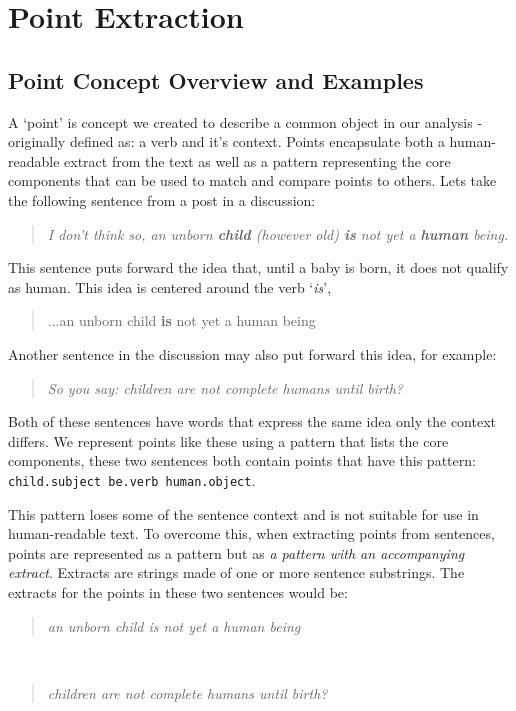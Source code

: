 \chapter{Point Extraction\label{chap:point-extraction}}
  \section{Point Concept Overview and Examples}
    A `point' is concept we created to describe a common object in our analysis - originally defined as: a verb and it's context. Points encapsulate both a human-readable extract from the text as well as a pattern representing the core components that can be used to match and compare points to others. Lets take the following sentence from a post in a discussion:

    \smallskip
    \begin{center}
      \blockquote{\textit{I don't think so, an unborn \textbf{child} (however old) \textbf{is} not yet a \textbf{human} being.}}
    \end{center}
    \smallskip

    This sentence puts forward the idea that, until a baby is born, it does not qualify as human. This idea is centered around the verb `\textit{is}', \blockquote{...an unborn child \textbf{is} not yet a human being}. Another sentence in the discussion may also put forward this idea, for example: \blockquote{\textit{So you say: children are not complete humans until birth?}}. Both of these sentences have words that express the same idea only the context differs. We represent points like these using a pattern that lists the core components, these two sentences both contain points that have this pattern: \texttt{child.subject be.verb human.object}.

    This pattern loses some of the sentence context and is not suitable for use in human-readable text. To overcome this, when extracting points from sentences, points are represented as a pattern but as \textit{a pattern with an accompanying extract}. Extracts are strings made of one or more sentence substrings. The extracts for the points in these two sentences would be:

    \smallskip
    \begin{center}
      \blockquote{\textit{an unborn child is not yet a human being}} \\ \blockquote{\textit{children are not complete humans until birth?}}
    \end{center}
    \smallskip

